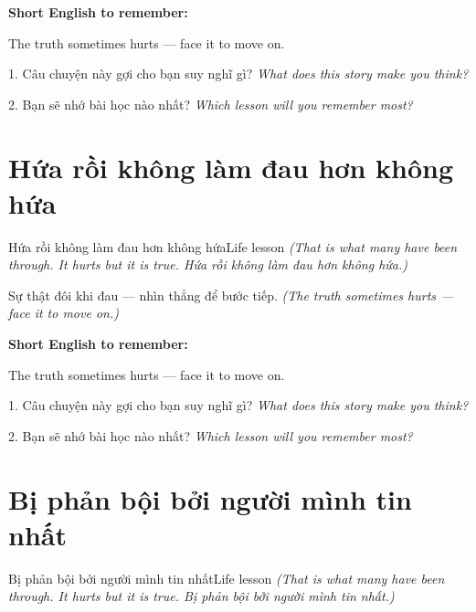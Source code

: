 \begin{ghinhoanh}
\textbf{Short English to remember:}

The truth sometimes hurts — face it to move on.

\end{ghinhoanh}

\begin{tuhocnhanh}
1. Câu chuyện này gợi cho bạn suy nghĩ gì? \textit{What does this story make you think?}

2. Bạn sẽ nhớ bài học nào nhất? \textit{Which lesson will you remember most?}
\end{tuhocnhanh}
\ngancach


\section{Hứa rồi không làm đau hơn không hứa}
\begin{truyen}{Hứa rồi không làm đau hơn không hứa}{Life lesson}
\textit{(That is what many have been through. It hurts but it is true. Hứa rồi không làm đau hơn không hứa.)}
\end{truyen}

\begin{baihoc}
Sự thật đôi khi đau — nhìn thẳng để bước tiếp.
\textit{(The truth sometimes hurts — face it to move on.)}
\end{baihoc}

\begin{ghinhoanh}
\textbf{Short English to remember:}

The truth sometimes hurts — face it to move on.

\end{ghinhoanh}

\begin{tuhocnhanh}
1. Câu chuyện này gợi cho bạn suy nghĩ gì? \textit{What does this story make you think?}

2. Bạn sẽ nhớ bài học nào nhất? \textit{Which lesson will you remember most?}
\end{tuhocnhanh}
\ngancach


\section{Bị phản bội bởi người mình tin nhất}
\begin{truyen}{Bị phản bội bởi người mình tin nhất}{Life lesson}
\textit{(That is what many have been through. It hurts but it is true. Bị phản bội bởi người mình tin nhất.)}
\end{truyen}

